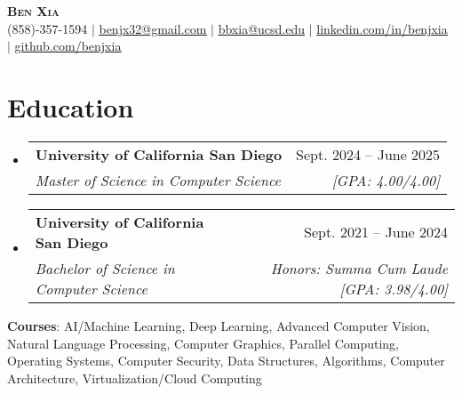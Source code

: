 \documentclass[letterpaper, 10pt]{article}
\makeatletter
\newcommand{\resumeSubheading}[4]{
  \vspace{4pt}\item
    \begin{tabular*}{0.97\textwidth}[t]{l@{\extracolsep{\fill}}r}
      \textbf{#1} & #2 \\
      \textit{#3} & \textit{\small #4} \\
    \end{tabular*}\vspace{-8pt}
}
\newcommand{\resumeSubHeadingListStart}{\begin{itemize}[leftmargin=0.15in, label={}]}
\newcommand{\resumeSubHeadingListEnd}{\end{itemize}}
\makeatother
\begin{document}

\begin{center}
  \textbf{\huge \scshape Ben Xia} \uline{} \\ \vspace{1pt}
  \small (858)-357-1594 $|$
  \href{mailto:benjx32@gmail.com}{\uline{benjx32@gmail.com}} $|$
  \href{mailto:bbxia@ucsd.edu}{\uline{bbxia@ucsd.edu}} $|$
  \href{https://linkedin.com/in/benjxia}{\uline{linkedin.com/in/benjxia}} $|$
  \href{https://github.com/benjxia}{\uline{github.com/benjxia}}
\end{center}
\vspace{-16pt}



\section{Education}
  \resumeSubHeadingListStart
  \resumeSubheading
      {University of California San Diego}{Sept. 2024 -- June 2025}
      {Master of Science in Computer Science}{[GPA: 4.00/4.00]}
  \resumeSubheading
      {University of California San Diego}{Sept. 2021 -- June 2024}
      {Bachelor of Science in Computer Science}{Honors: Summa Cum Laude [GPA: 3.98/4.00]}
  \resumeSubHeadingListEnd
  \begin{itemize}[leftmargin=0.15in, label={}]
    \small{\item{
     \textbf{Courses}{: AI/Machine Learning, Deep Learning, Advanced Computer Vision, Natural Language Processing, Computer Graphics, Parallel Computing, Operating Systems, Computer Security, Data Structures, Algorithms, Computer Architecture, Virtualization/Cloud Computing} \\
    }}
 \end{itemize}

%
\end{document}
